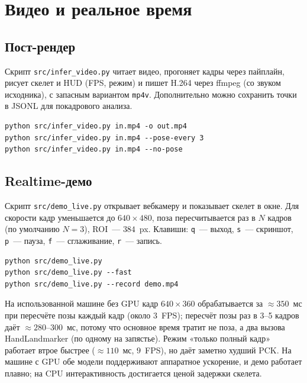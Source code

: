 \documentclass[11pt,a4paper]{article}
\begin{document}
\section{Видео и реальное время}
\label{sec:video}

\subsection{Пост-рендер}

Скрипт \texttt{src/infer\_video.py} читает видео, прогоняет кадры через
пайплайн, рисует скелет и HUD (FPS, режим) и пишет H.264 через ffmpeg
(со звуком исходника), с запасным вариантом \texttt{mp4v}. Дополнительно можно
сохранить точки в JSONL для покадрового анализа.

\noindent\begin{minipage}{\linewidth}
\begin{lstlisting}[basicstyle=\ttfamily\scriptsize,breaklines=false,xleftmargin=0pt]
python src/infer_video.py in.mp4 -o out.mp4
python src/infer_video.py in.mp4 --pose-every 3
python src/infer_video.py in.mp4 --no-pose
\end{lstlisting}
\end{minipage}

\subsection{Realtime-демо}

Скрипт \texttt{src/demo\_live.py} открывает вебкамеру и показывает скелет в
окне. Для скорости кадр уменьшается до \(640\times480\), поза пересчитывается
раз в \(N\) кадров (по умолчанию \(N=3\)), ROI~--- \(384\)~px. Клавиши:
\texttt{q}~--- выход, \texttt{s}~--- скриншот, \texttt{p}~--- пауза,
\texttt{f}~--- сглаживание, \texttt{r}~--- запись.

\noindent\begin{minipage}{\linewidth}
\begin{lstlisting}[basicstyle=\ttfamily\scriptsize,breaklines=false,xleftmargin=0pt]
python src/demo_live.py
python src/demo_live.py --fast
python src/demo_live.py --record demo.mp4
\end{lstlisting}
\end{minipage}

На использованной машине без GPU кадр \(640\times360\) обрабатывается за
\(\approx 350\)~мс при пересчёте позы каждый кадр (около \(3\)~FPS); пересчёт
позы раз в 3--5 кадров даёт \(\approx 280\)--\(300\)~мс, потому что основное
время тратит не поза, а два вызова HandLandmarker (по одному на запястье).
Режим «только полный кадр» работает втрое быстрее (\(\approx 110\)~мс,
\(9\)~FPS), но даёт заметно худший PCK. На машине с GPU обе модели
поддерживают аппаратное ускорение, и демо работает плавно; на CPU
интерактивность достигается ценой задержки скелета.
\end{document}
